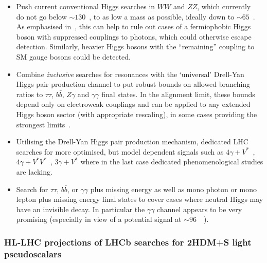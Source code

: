 \documentclass[../report.tex]{subfiles}
\providecommand{\main}{..}
\begin{document}
\begin{itemize}
\item Push current conventional Higgs searches in $WW$ and $ZZ$, which
  currently~\cite{Khachatryan:2015cwa,Sirunyan:2018qlb} do not go below
  $\sim 130$~\UGeV, to as low a mass as possible, ideally down to $\sim
  65$~\UGeV. As emphasised in~\cite{Delgado:2016arn,Vega:2018ddp}, this
  can help to rule out cases of a fermiophobic Higgs boson with
  suppressed couplings to photons, which could otherwise escape
  detection. Similarly, heavier Higgs bosons with the ``remaining''
  coupling to SM gauge bosons could be detected.

\item Combine \emph{inclusive} searches for resonances with the
  `universal' Drell-Yan Higgs pair production channel to put robust
  bounds on allowed branching ratios to $\tau\tau$, $b\bar{b}$, $Z\gamma$ and
  $\gamma\gamma$ final states. In the alignment limit,
  these bounds depend only on electroweak couplings and can be applied
  to any extended Higgs boson sector (with appropriate rescaling), in
  some cases providing the strongest limits~\cite{Delgado:2016arn,Vega:2018ddp}.

\item Utilising the Drell-Yan Higgs pair production mechanism, dedicated
  LHC searches for more optimised, but model dependent signals such as
  $4\gamma + V^\ast$~\cite{Akeroyd:2003bt,Aaltonen:2016fnw,Arhrib:2017wmo},
  $4\gamma + V^\ast V^\ast$~\cite{Akeroyd:2003bt}, $3\gamma +
  V^\ast$ where in the last case dedicated phenomenological studies are
  lacking. 

\item Search for $\tau\tau$, $b\bar{b}$, or $\gamma\gamma$ plus missing
  energy as well as mono photon or mono lepton plus missing energy final
  states to cover cases where neutral Higgs may have an invisible
  decay. In particular the $\gamma\gamma$ channel appears to be
  very promising (especially in view of a potential signal at 
  $\sim 96$~\UGeV~\cite{CMS-PAS-HIG-17-013}).
 
\end{itemize}






\subsubsection{HL-LHC projections of LHCb searches for 2HDM+S light pseudoscalars}\label{Sec:9.8LHCb}






%
\end{document}
